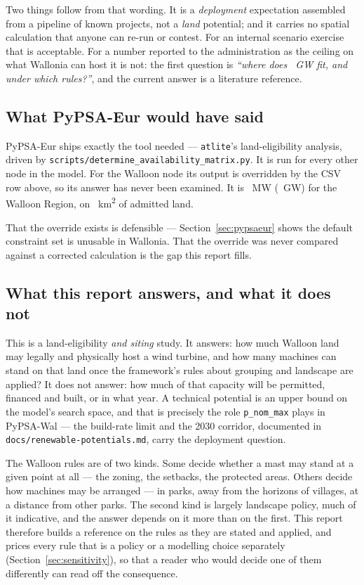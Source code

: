 \documentclass[11pt,a4paper]{article}
\begin{document}
Two things follow from that wording. It is a \emph{deployment} expectation
assembled from a pipeline of known projects, not a \emph{land} potential; and it
carries no spatial calculation that anyone can re-run or contest. For an
internal scenario exercise that is acceptable. For a number reported to the
administration as the ceiling on what Wallonia can host it is not: the first
question is \emph{``where does \CapTodayGW{}~GW fit, and under which rules?''},
and the current answer is a literature reference.

\subsection{What PyPSA-Eur would have said}

PyPSA-Eur ships exactly the tool needed --- \texttt{atlite}'s land-eligibility
analysis, driven by \texttt{scripts/determine\_availability\_matrix.py}. It is
run for every other node in the model. For the Walloon node its output is
overridden by the CSV row above, so its answer has never been examined. It is
\BasePnom{}~MW (\BasePnomGW{}~GW) for the Walloon Region, on
\BaseEligible{}~\si{\square\kilo\metre} of admitted land.

That the override exists is defensible --- Section~\ref{sec:pypsaeur} shows the
default constraint set is unusable in Wallonia. That the override was never
compared against a corrected calculation is the gap this report fills.

\subsection{What this report answers, and what it does not}

This is a land-eligibility \emph{and siting} study. It answers: how much Walloon
land may legally and physically host a wind turbine, and how many machines can
stand on that land once the framework's rules about grouping and landscape are
applied? It does not answer: how much of that capacity will be permitted,
financed and built, or in what year. A technical potential is an upper bound on
the model's search space, and that is precisely the role \texttt{p\_nom\_max}
plays in PyPSA-Wal --- the build-rate limit and the 2030 corridor, documented in
\texttt{docs/renewable-potentials.md}, carry the deployment question.

The Walloon rules are of two kinds. Some decide whether a mast may stand at a
given point at all --- the zoning, the setbacks, the protected areas. Others
decide how machines may be arranged --- in parks, away from the horizons of
villages, at a distance from other parks. The second kind is largely landscape
policy, much of it indicative, and the answer depends on it more than on the
first. This report therefore builds a reference on the rules as they are stated
and applied, and prices every rule that is a policy or a modelling choice
separately (Section~\ref{sec:sensitivity}), so that a reader who would decide
one of them differently can read off the consequence.
\end{document}

